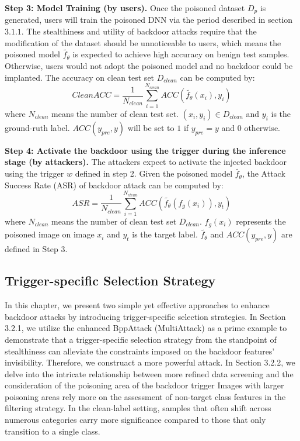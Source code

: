 \documentclass{article}
\begin{document}
\textbf{Step 3: Model Training (by users).} Once the poisoned dataset \(D_p\) is generated, users will train the poisoned DNN via the period described in section \(3.1.1\). The stealthiness and utility of backdoor attacks require that the modification of the dataset should be unnoticeable to users, which means the poisoned model \(\tilde{f_{\theta}}\) is expected to achieve high accuracy on benign test samples. Otherwise, users would not adopt the poisoned model and no backdoor could be implanted. The accuracy on clean test set \(D_{clean}\) can be computed by:
\begin{equation}
CleanACC = \frac{1}{N_{clean}}\sum_{i=1}^{N_{clean}}{ACC(\tilde{f_{\theta}}(x_i),y_i)}
\end{equation}
where \(N_{clean}\) means the number of clean test set. \((x_i,y_i) \in D_{clean}\) and \(y_i\) is the ground-ruth label. \(ACC(y_{pre},y)\) will be set to \(1\) if \(y_{pre} = y\) and \(0\) otherwise.

\textbf{Step 4: Activate the backdoor using the trigger during the inference stage (by attackers).} The attackers expect to activate the injected backdoor using the trigger \(w\) defined in step 2. Given the poisoned model \(\tilde{f_{\theta}}\), the Attack Success Rate (ASR) of backdoor attack can be computed by:
\begin{equation}
ASR = \frac{1}{N_{clean}}\sum_{i=1}^{N_{clean}}{ACC(\tilde{f_{\theta}}(f_g(x_i)),y_t)}
\end{equation}
where \(N_{clean}\) means the number of clean test set \(D_{clean}\).  \(f_g(x_i)\) represents the poisoned image on image \(x_i\) and \(y_t\) is the target label. \(\tilde{f_{\theta}}\) and \(ACC(y_{pre},y)\) are defined in Step 3.
\subsection{Trigger-specific Selection Strategy}
In this chapter, we present two simple yet effective approaches to enhance backdoor attacks by introducing trigger-specific selection strategies. In Section 3.2.1, we utilize the enhanced BppAttack (MultiAttack) as a prime example to demonstrate that a trigger-specific selection strategy from the standpoint of stealthiness can alleviate the constraints imposed on the backdoor features' invisibility. Therefore, we construact a more powerful attack. In Section 3.2.2, we delve into the intricate relationship between more refined data screening and the consideration of the poisoning area of the backdoor trigger Images with larger poisoning areas rely more on the assessment of non-target class features in the filtering strategy. In the clean-label setting, samples that often shift across numerous categories carry more significance compared to those that only transition to a single class.
\end{document}
